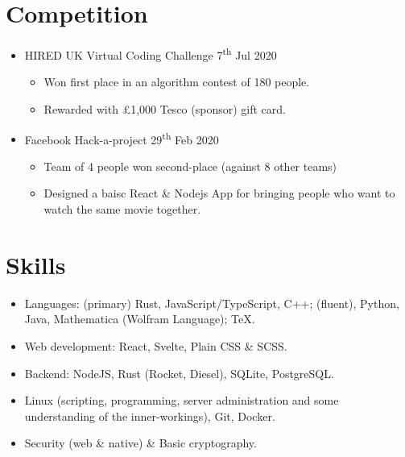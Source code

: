   \section{Competition}

  \begin{itemize}
    \item HIRED \dashdiv{} UK Virtual Coding Challenge \dashdiv{} 7\textsuperscript{th} Jul 2020
    \begin{itemize}
      \item Won first place in an algorithm contest of 180 people.
      \item Rewarded with £1,000 Tesco (sponsor) gift card.
    \end{itemize}
    \item Facebook \dashdiv{} Hack-a-project \dashdiv{} 29\textsuperscript{th} Feb 2020
    \begin{itemize}
      \item Team of 4 people won second-place (against 8 other teams)
      \item Designed a baisc React \& Nodejs App  for bringing people who want to watch the same movie together.
    \end{itemize}
  \end{itemize}

  \section{Skills}

  \begin{itemize}[itemsep=0.1\parskip]
    \item Languages: (primary) Rust, JavaScript/TypeScript, C++; (fluent), Python, Java, Mathematica (Wolfram Language); \TeX.

    \item Web development: React, Svelte, Plain CSS \& SCSS.

    \item Backend: NodeJS, Rust (Rocket, Diesel), SQLite, PostgreSQL.

    \item Linux (scripting, programming, server administration and some understanding of the inner-workings), Git, Docker. %

    \item Security (web \& native) \& Basic cryptography.

  \end{itemize}

